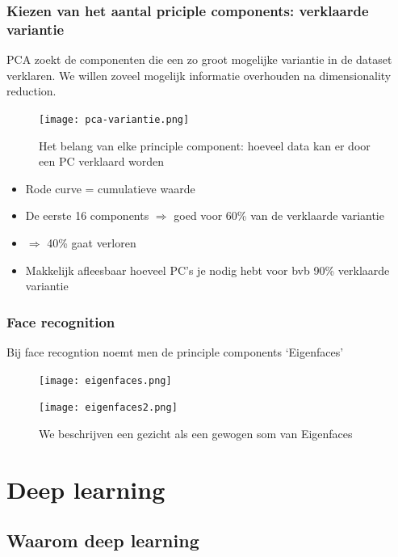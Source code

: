 \documentclass{article}
\begin{document}
\subsubsection{Kiezen van het aantal priciple components: verklaarde variantie}

PCA zoekt de componenten die een zo groot mogelijke variantie in de dataset verklaren. 
We willen zoveel mogelijk informatie overhouden na dimensionality reduction.

\begin{figure}[H]
    \centering
    \texttt{[image: pca-variantie.png]}
    \caption{Het belang van elke principle component: hoeveel data kan er door een PC verklaard worden}
\end{figure}

\begin{itemize}
    \item Rode curve = cumulatieve waarde
    \item De eerste 16 components $\Rightarrow$ goed voor 60\% van de verklaarde variantie
    \item $\Rightarrow$ 40\% gaat verloren
    \item Makkelijk afleesbaar hoeveel PC's je nodig hebt voor bvb 90\% verklaarde variantie
\end{itemize}


\subsubsection{Face recognition}

Bij face recogntion noemt men de principle components `Eigenfaces'

\begin{figure}[H]
    \centering
    \texttt{[image: eigenfaces.png]}
\end{figure}

\begin{figure}[H]
    \centering
    \texttt{[image: eigenfaces2.png]}
    \caption{We beschrijven een gezicht als een gewogen som van Eigenfaces}
\end{figure}


\section{Deep learning}

\subsection{Waarom deep learning}
\end{document}
